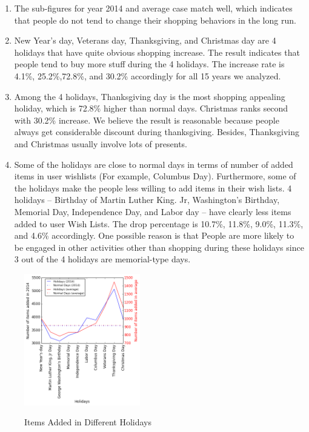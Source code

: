 \begin{enumerate}[leftmargin=*]
\item The sub-figures for year 2014 and average case match well, which indicates that people do not tend to change their shopping behaviors in the long run. 
\item New Year's day, Veterans day, Thanksgiving, and Christmas day are 4 holidays that have quite obvious shopping increase. The result indicates that people tend to buy more stuff during the 4 holidays. The increase rate is 4.1\%, 25.2\%,72.8\%, and 30.2\% accordingly for all 15 years we analyzed. 
\item Among the 4 holidays, Thanksgiving day is the most shopping appealing holiday, which is 72.8\% higher than normal days. Christmas ranks second with 30.2\% increase. We believe the result is reasonable because people always get considerable discount during thanksgiving. Besides, Thanksgiving and Christmas usually involve lots of presents.
\item Some of the holidays are close to normal days in terms of number of added items in user wishlists (For example, Columbus Day). Furthermore, some of the holidays make the people less willing to add items in their wish lists. 4 holidays -- Birthday of Martin Luther King. Jr, Washington's Birthday, Memorial Day, Independence Day, and Labor day --  have clearly less items added to user Wish Lists. The drop percentage is 10.7\%, 11.8\%, 9.0\%, 11.3\%, and 4.6\% accordingly. One possible reason is that People are more likely to be engaged in other activities other than shopping during these holidays since 3 out of the 4 holidays are memorial-type days.

\end{enumerate}

\begin{figure}[t]
\centering
  \caption{Items Added in Different Holidays}{}
  \label{fig:diffholiday}
  \centering
    \includegraphics[width=0.45\textwidth]{holidayfig.png}
\end{figure}

